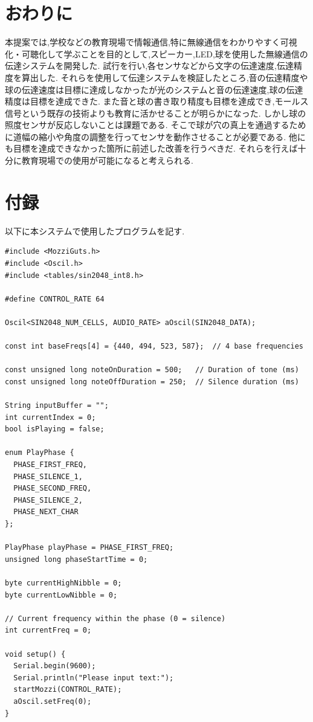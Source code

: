 \section{おわりに}
本提案では,学校などの教育現場で情報通信,特に無線通信をわかりやすく可視化・可聴化して学ぶことを目的として,スピーカー,LED,球を使用した無線通信の伝達システムを開発した.
試行を行い,各センサなどから文字の伝達速度,伝達精度を算出した.
それらを使用して伝達システムを検証したところ,音の伝達精度や球の伝達速度は目標に達成しなかったが光のシステムと音の伝達速度,球の伝達精度は目標を達成できた.
また音と球の書き取り精度も目標を達成でき,モールス信号という既存の技術よりも教育に活かせることが明らかになった.
しかし球の照度センサが反応しないことは課題である.
そこで球が穴の真上を通過するために道幅の縮小や角度の調整を行ってセンサを動作させることが必要である.
他にも目標を達成できなかった箇所に前述した改善を行うべきだ.
それらを行えば十分に教育現場での使用が可能になると考えられる.







\appendix
\section{付録}

以下に本システムで使用したプログラムを記す.


\begin{lstlisting}[caption=Transmission of sound,label=lst:led]
#include <MozziGuts.h>
#include <Oscil.h>
#include <tables/sin2048_int8.h>

#define CONTROL_RATE 64

Oscil<SIN2048_NUM_CELLS, AUDIO_RATE> aOscil(SIN2048_DATA);

const int baseFreqs[4] = {440, 494, 523, 587};  // 4 base frequencies

const unsigned long noteOnDuration = 500;   // Duration of tone (ms)
const unsigned long noteOffDuration = 250;  // Silence duration (ms)

String inputBuffer = "";
int currentIndex = 0;
bool isPlaying = false;

enum PlayPhase {
  PHASE_FIRST_FREQ,
  PHASE_SILENCE_1,
  PHASE_SECOND_FREQ,
  PHASE_SILENCE_2,
  PHASE_NEXT_CHAR
};

PlayPhase playPhase = PHASE_FIRST_FREQ;
unsigned long phaseStartTime = 0;

byte currentHighNibble = 0;
byte currentLowNibble = 0;

// Current frequency within the phase (0 = silence)
int currentFreq = 0;

void setup() {
  Serial.begin(9600);
  Serial.println("Please input text:");
  startMozzi(CONTROL_RATE);
  aOscil.setFreq(0);
}
\end{lstlisting}

